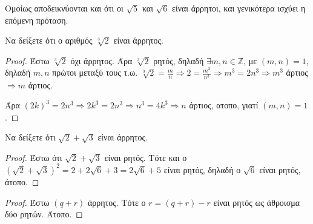 \documentclass[main.tex]{subfiles}
\begin{document}
\begin{rem}
    Ομοίως αποδεικνύονται και ότι οι $ \sqrt{5}$ και  $ \sqrt{6} $ είναι άρρητοι, 
    και γενικότερα ισχύει η επόμενη πρόταση.
\end{rem}


\begin{example}
    Να δείξετε ότι ο αριθμός $ \sqrt[3]{2} $ είναι άρρητος.
\end{example}

\begin{proof}
    Έστω $ \sqrt[3]{2} $ όχι άρρητος. Άρα $ \sqrt[3]{2} $ ρητός, δηλαδή $ \exists m,n 
    \in \mathbb{Z} $, με $ (m,n)=1 $, δηλαδή $ m,n $ πρώτοι μεταξύ τους
    τ.ω. $ \sqrt[3]{2} = \frac{m}{n} \Rightarrow 2 = \frac{m^{3}}{n^{3}} \Rightarrow 
    m^{3} = 2n^{3} \Rightarrow m^{3} $ άρτιος $ \Rightarrow m $ άρτιος. 

    Άρα $ (2k)^{3} = 2n^{3} \Rightarrow 2k^{3}=2n^{3} \Rightarrow n^{3} = 4k^{3} 
    \Rightarrow n $ άρτιος,  ατοπο, γιατί $ (m,n)=1 $.
\end{proof}

\begin{example}
    Να δείξετε ότι $ \sqrt{2} + \sqrt{3} $ είναι άρρητος.
\end{example}

\begin{proof}
    Έστω ότι $ \sqrt{2} + \sqrt{3} $ είναι ρητός. Τότε και ο $ (\sqrt{2} + \sqrt{3} )
    ^{2} = 2 + 2 \sqrt{6} + 3 = 2 \sqrt{6} + 5 $ είναι ρητός, δηλαδή ο $ \sqrt{6} $ 
    είναι ρητός, άτοπο.
\end{proof}


\begin{proof}
\item {}
    Έστω $(q+r)$ άρρητος. Τότε ο $ r = (q+r)-r $ είναι ρητός ως άθροισμα δύο 
    ρητών. Άτοπο.
\end{proof}

\end{document}
